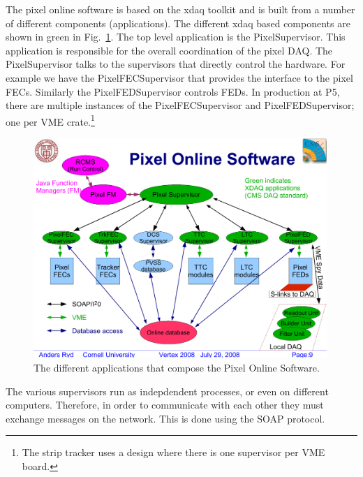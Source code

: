 
The pixel online software is based on the xdaq toolkit and is
built from a number of different components (applications). The
different xdaq based components are shown in green in 
Fig.~\ref{fig:components}. The top level application is the 
PixelSupervisor. This application is responsible for the overall
coordination of the pixel DAQ. The PixelSupervisor talks to the
supervisors that directly control the hardware. For example 
we have the PixelFECSupervisor that provides the interface to the
pixel FECs. Similarly the PixelFEDSupervisor controls FEDs. 
In production at P5, there are multiple instances of the PixelFECSupervisor and
PixelFEDSupervisor; one per VME crate.\footnote{The strip tracker
uses a design where there is one supervisor per VME board.}

\begin{figure}
\begin{center}
 \includegraphics[width=0.99\textwidth]{POScomponents.pdf}
\end{center}
\caption{The different applications that compose the Pixel Online Software.}
\label{fig:components}
\end{figure}

The various supervisors run as indepdendent processes, or even on
different computers. Therefore, in order to communicate with each
other they must exchange messages on the network. This is done using
the SOAP protocol.


